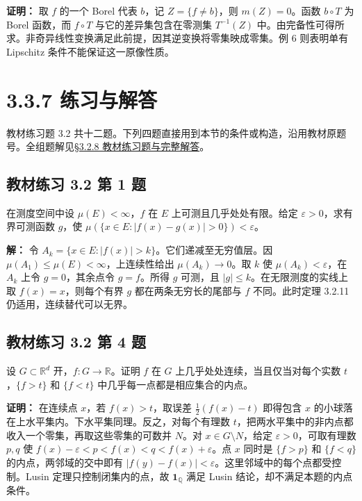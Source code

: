 \documentclass[11pt,a4paper]{article}
\begin{document}
\textbf{证明：} 取 \(f\) 的一个 Borel 代表 \(b\)，记
\(Z=\{f\ne b\}\)，则 \(m(Z)=0\)。函数 \(b\circ T\) 为 Borel 函数，而
\(f\circ T\) 与它的差异集包含在零测集 \(T^{-1}(Z)\)
中。由完备性可得所求。非奇异线性变换满足此前提，因其逆变换将零集映成零集。例
6 则表明单有 Lipschitz 条件不能保证这一原像性质。

\clearpage\section[\S{}3.3.7 练习与解答]{3.3.7 练习与解答}\label{ux7ec3ux4e60ux4e0eux89e3ux7b54}

教材练习题 3.2
共十二题。下列四题直接用到本节的条件或构造，沿用教材原题号。全组题解见\href{https://zj139.github.io/math-notes/notes/3e0384d9521c7049c244a5ac/\#328-教材练习题与完整解答}{§3.2.8
教材练习题与完整解答}。

\subsection{教材练习 3.2 第 1
题}\label{ux6559ux6750ux7ec3ux4e60-3.2-ux7b2c-1-ux9898}

在测度空间中设 \(\mu(E)<\infty\)，\(f\) 在 \(E\)
上可测且几乎处处有限。给定 \(\varepsilon>0\)，求有界可测函数 \(g\)，使
\(\mu(\{x\in E:|f(x)-g(x)|>0\})<\varepsilon\)。

\textbf{解：} 令 \(A_k=\{x\in E:|f(x)|>k\}\)。它们递减至无穷值层。因
\(\mu(A_1)\le\mu(E)<\infty\)，上连续性给出 \(\mu(A_k)\to0\)。取 \(k\) 使
\(\mu(A_k)<\varepsilon\)，在 \(A_k\) 上令 \(g=0\)，其余点令
\(g=f\)。所得 \(g\) 可测，且 \(|g|\le k\)。在无限测度的实线上取
\(f(x)=x\)，则每个有界 \(g\) 都在两条无穷长的尾部与 \(f\) 不同。此时定理
3.2.11 仍适用，连续替代可以无界。

\subsection{教材练习 3.2 第 4
题}\label{ux6559ux6750ux7ec3ux4e60-3.2-ux7b2c-4-ux9898}

设 \(G\subset\mathbb R^d\) 开，\(f:G\to\mathbb R\)。证明 \(f\) 在 \(G\)
上几乎处处连续，当且仅当对每个实数 \(t\)，\(\{f>t\}\) 和 \(\{f<t\}\)
中几乎每一点都是相应集合的内点。

\textbf{证明：} 在连续点 \(x\)，若 \(f(x)>t\)，取误差
\(\frac{1}{2}(f(x)-t)\) 即得包含 \(x\)
的小球落在上水平集内。下水平集同理。反之，对每个有理数
\(t\)，把两水平集中的非内点都收入一个零集，再取这些零集的可数并
\(N\)。对 \(x\in G\setminus N\)，给定 \(\varepsilon>0\)，可取有理数
\(p,q\) 使 \(f(x)-\varepsilon<p<f(x)<q<f(x)+\varepsilon\)。点 \(x\)
同时是 \(\{f>p\}\) 和 \(\{f<q\}\) 的内点，两邻域的交中即有
\(|f(y)-f(x)|<\varepsilon\)。这里邻域中的每个点都受控制。Lusin
定理只控制闭集内的点，故 \(\mathbf1_{\mathbb Q}\) 满足 Lusin
结论，却不满足本题的内点条件。
\end{document}
